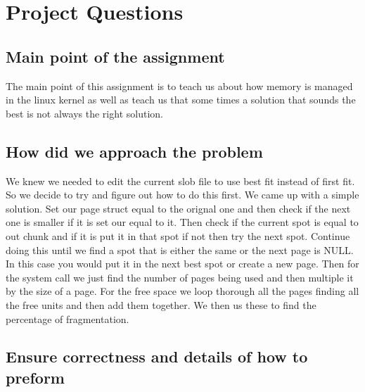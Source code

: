 \documentclass[letterpaper,10pt,titlepage]{article}
\begin{document}
\section{Project Questions}

\subsection{Main point of the assignment}
The main point of this assignment is to teach us about how memory is managed 
in the linux kernel as well as teach us that some times a solution that sounds
the best is not always the right solution.

\subsection{How did we approach the problem}
We knew we needed to edit the current slob file to use best fit instead of first 
fit. So we decide to try and figure out how to do this first. We came up with a 
simple solution. Set our page struct equal to the orignal one and then check if 
the next one is smaller if it is set our equal to it. Then check if the current 
spot is equal to out chunk and if it is put it in that spot if not then try the 
next spot. Continue doing this until we find a spot that is either the same or 
the next page is NULL. In this case you would put it in the next best spot 
or create a new page. Then for the  system call we just find the number of 
pages being used and then multiple it by the size of a page. For the free 
space we loop thorough all the pages finding all the free units and then add them 
together. We then us these to find the percentage of fragmentation.

\subsection{Ensure correctness and details of how to preform}
\end{document}
